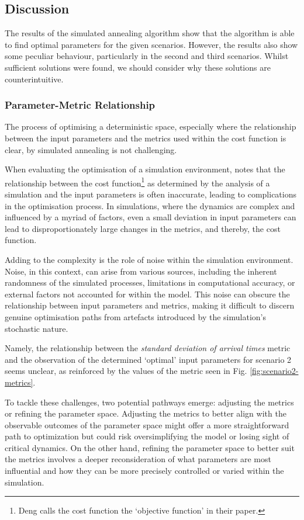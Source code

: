 \documentclass[12pt]{article}
\begin{document}
\subsection{Discussion}
\label{sec:results-discussion}
The results of the simulated annealing algorithm show that the algorithm is able to find optimal parameters for the given scenarios. However, the results also show some peculiar behaviour, particularly in the second and third scenarios. Whilst sufficient solutions were found, we should consider why these solutions are counterintuitive.

\subsubsection{Parameter-Metric Relationship}
The process of optimising a deterministic space, especially where the relationship between the input parameters and the metrics used within the cost function is clear, by simulated annealing is not challenging.

When evaluating the optimisation of a simulation environment, \citet{deng} notes that the relationship between the cost function\footnote{Deng calls the cost function the `objective function' in their paper.} as determined by the analysis of a simulation and the input parameters is often inaccurate, leading to complications in the optimisation process. In simulations, where the dynamics are complex and influenced by a myriad of factors, even a small deviation in input parameters can lead to disproportionately large changes in the metrics, and thereby, the cost function.

Adding to the complexity is the role of noise within the simulation environment. Noise, in this context, can arise from various sources, including the inherent randomness of the simulated processes, limitations in computational accuracy, or external factors not accounted for within the model. This noise can obscure the relationship between input parameters and metrics, making it difficult to discern genuine optimisation paths from artefacts introduced by the simulation's stochastic nature.

Namely, the relationship between the \emph{standard deviation of arrival times} metric and the observation of the determined `optimal' input parameters for scenario 2 seems unclear, as reinforced by the values of the metric seen in Fig. \ref{fig:scenario2-metrics}.

To tackle these challenges, two potential pathways emerge: adjusting the metrics or refining the parameter space. Adjusting the metrics to better align with the observable outcomes of the parameter space might offer a more straightforward path to optimization but could risk oversimplifying the model or losing sight of critical dynamics. On the other hand, refining the parameter space to better suit the metrics involves a deeper reconsideration of what parameters are most influential and how they can be more precisely controlled or varied within the simulation.
\end{document}
